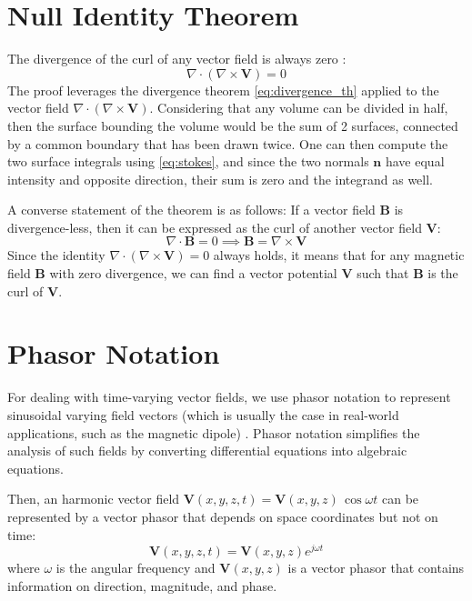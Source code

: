 \section{Null Identity Theorem}
The divergence of the curl of any vector field is always zero \cite{book-magnetism}:
\begin{equation}
\nabla \cdot (\nabla \times \mathbf{V}) = 0 
\label{eq:null}
\end{equation}
The proof leverages the divergence theorem \ref{eq:divergence_th} applied to the 
vector field \(\nabla \cdot (\nabla \times \mathbf{V})\). Considering that any 
volume can be divided in half, then the surface bounding the volume would be the 
sum of 2 surfaces, connected by a common boundary that has been drawn twice. One 
can then compute the two surface integrals using \ref{eq:stokes}, and since the 
two normals \(\mathbf{n}\) have equal intensity and opposite direction, their sum 
is zero and the integrand as well.

A converse statement of the theorem is as follows: 
If a vector field \(\mathbf{B}\) is divergence-less, then it can be expressed as 
the curl of another vector field \(\mathbf{V}\):
\[
\nabla \cdot \mathbf{B} = 0 \implies \mathbf{B} = \nabla \times \mathbf{V}
\]
Since the identity \(\nabla \cdot (\nabla \times \mathbf{V}) = 0\) always holds, 
it means that for any magnetic field \(\mathbf{B}\) with zero divergence, we can 
find a vector potential \(\mathbf{V}\) such that \(\mathbf{B}\) is the curl of 
\(\mathbf{V}\).

\section{Phasor Notation} \label{Phasor Notation}
For dealing with time-varying vector fields, we use phasor notation to represent 
sinusoidal varying field vectors (which is usually the case in real-world 
applications, such as the magnetic dipole) \cite{book-magnetism}. Phasor notation 
simplifies the analysis of such fields by converting differential equations into 
algebraic equations.

Then, an harmonic vector field \( \mathbf{V}(x, y, z, t) = \mathbf{V}(x, y, z) 
\, \cos\omega t\) can be represented by a vector phasor that depends on space 
coordinates but not on time:
\[
\mathbf{V}(x, y, z, t) = \mathbf{V}(x, y, z) e^{j\omega t}
\]
where \(\omega\) is the angular frequency and \( \mathbf{V}(x, y, z) \) is a 
vector phasor that contains information on direction, magnitude, and phase.

